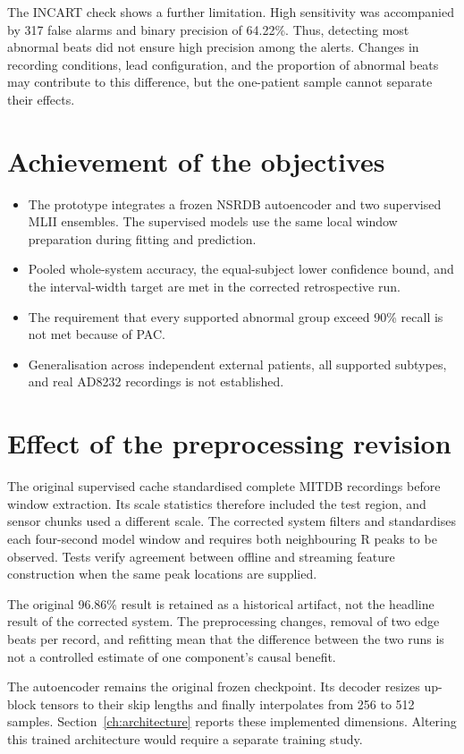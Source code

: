The INCART check shows a further limitation. High sensitivity was accompanied
by 317 false alarms and binary precision of 64.22\%. Thus, detecting most
abnormal beats did not ensure high precision among the alerts. Changes in
recording conditions, lead configuration, and the proportion of abnormal
beats may contribute to this difference, but the one-patient sample cannot
separate their effects.

\section{Achievement of the objectives}
\begin{itemize}
\item The prototype integrates a frozen NSRDB autoencoder and two supervised
MLII ensembles. The supervised models use the same local window preparation
during fitting and prediction.
\item Pooled whole-system accuracy, the equal-subject lower confidence bound,
and the interval-width target are met in the corrected retrospective run.
\item The requirement that every supported abnormal group exceed 90\% recall
is not met because of PAC.
\item Generalisation across independent external patients, all supported
subtypes, and real AD8232 recordings is not established.
\end{itemize}

\section{Effect of the preprocessing revision}
The original supervised cache standardised complete MITDB recordings before
window extraction. Its scale statistics therefore included the test region,
and sensor chunks used a different scale. The corrected system filters and
standardises each four-second model window and requires both neighbouring
R peaks to be observed. Tests verify agreement between offline and streaming
feature construction when the same peak locations are supplied.

The original 96.86\% result is retained as a historical artifact, not the
headline result of the corrected system. The preprocessing changes, removal
of two edge beats per record, and refitting mean that the difference between
the two runs is not a controlled estimate of one component's causal benefit.

The autoencoder remains the original frozen checkpoint. Its decoder resizes
up-block tensors to their skip lengths and finally interpolates from 256 to
512 samples. Section~\ref{ch:architecture} reports these implemented dimensions. Altering this trained architecture would require a separate
training study.

